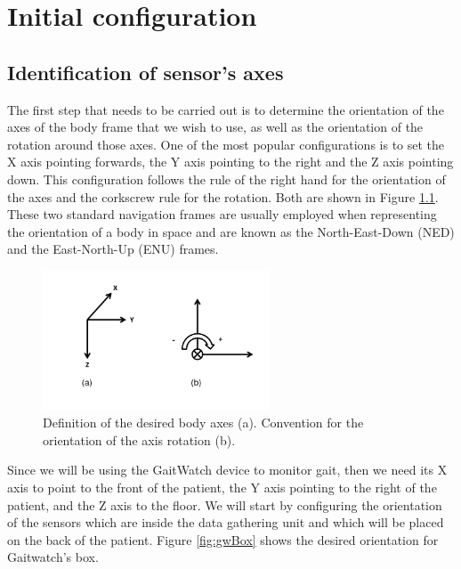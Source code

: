 \chapter{Initial configuration}
\label{ch:initial_conf}
\section{Identification of sensor's axes}
\indent The first step that needs to be carried out is to determine the orientation of the axes of the body frame that we wish to use, as well as the orientation of the rotation around those axes. One of the most popular configurations is to set the X axis pointing forwards, the Y axis pointing to the right and the Z axis pointing down. This configuration follows the rule of the right hand for the orientation of the axes and the corkscrew rule for the rotation. Both are shown in Figure \ref{fig:bodyAxes}. These two standard navigation frames are usually employed when representing the orientation of a body in space and are known as the North-East-Down (NED) and the East-North-Up (ENU) frames.

\begin{figure}[H]
\centering
\includegraphics[width=0.6\textwidth]{figures/bodyAxes}
\caption{Definition of the desired body axes (a). Convention for the orientation of the axis rotation (b).}
\label{fig:bodyAxes}
\end{figure}
Since we will be using the GaitWatch device to monitor gait, then we need its X axis to point to the front of the patient, the Y axis pointing to the right of the patient, and the Z axis to the floor. We will start by configuring the orientation of the sensors which are inside the data gathering unit and which will be placed on the back of the patient. Figure \ref{fig:gwBox} shows the desired orientation for Gaitwatch's box.

